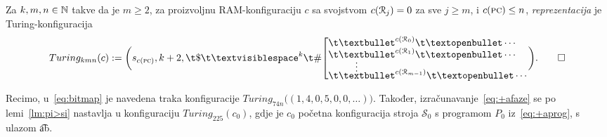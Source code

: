 \begin{definicija}
Za $k,m,n\in{\mathbb N}$ takve da je $m\ge 2$, za proizvoljnu RAM-konfiguraciju $c$ sa svojstvom $c(\mathcal R_{j})=0$ za sve $j\ge m$, i $c(\textsc{pc})\le n$, \emph{reprezentacija} je Turing-konfiguracija
\begin{equation}
Turing_{kmn}(c):=\biggl(s_{c(\textsc{pc})},k+2,\t\$\bl^k\t\#\!\left[\begin{array}{@{}l@{}}
\renewcommand{\arraystretch}{0.1}
\t\textbullet^{c(\reg0)}\t\textopenbullet\dotsm\\
\t\textbullet^{c(\reg1)}\t\textopenbullet\dotsm
\MTFlushSpaceBelow
\vdotswithin{\text\textbullet}
\MTFlushSpaceBelow
\t\textbullet^{c(\reg{m-1})}\t\textopenbullet\dotsm
\end{array}\right.\biggr)\text.\qedhere
\end{equation}
\end{definicija}

Recimo, u~\eqref{eq:bitmap} je navedena traka konfiguracije $Turing_{74n}\bigl((1,4,0,5,0,0,\dotsc)\bigr)$. Također, izračunavanje~\eqref{eq:+afaze} se po lemi~\ref{lm:pi>si} nastavlja u konfiguraciju $Turing_{225}(c_0)$, gdje je $c_0$ početna konfiguracija stroja $\mathcal S_0$ s programom $P_0$ iz~\eqref{eq:+aprog}, s ulazom \t{ab}.

